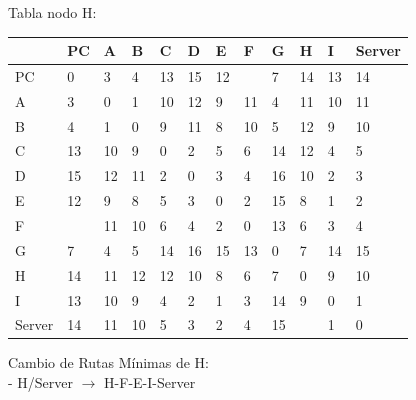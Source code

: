 \documentclass[a4paper]{article}
\begin{document}
\begin{table}[h]
Tabla nodo H:\\
\begin{tabular}{|l|l|l|l|l|l|l|l|l|l|l|l|}
\hline
       & PC & A  & B  & C  & D  & E  & F  & G  & H  & I  & Server \\ \hline
PC     & 0  & 3  & 4  & 13 & 15 & 12 &    & 7  & 14 & 13 & 14     \\ \hline
A      & 3  & 0  & 1  & 10 & 12 & 9  & 11 & 4  & 11 & 10 & 11     \\ \hline
B      & 4  & 1  & 0  & 9  & 11 & 8  & 10 & 5  & 12 & 9  & 10     \\ \hline
C      & 13 & 10 & 9  & 0  & 2  & 5  & 6  & 14 & 12 & 4  & 5      \\ \hline
D      & 15 & 12 & 11 & 2  & 0  & 3  & 4  & 16 & 10 & 2  & 3      \\ \hline
E      & 12 & 9  & 8  & 5  & 3  & 0  & 2  & 15 & 8  & 1  & 2      \\ \hline
F      &    & 11 & 10 & 6  & 4  & 2  & 0  & 13 & 6  & 3  & 4      \\ \hline
G      & 7  & 4  & 5  & 14 & 16 & 15 & 13 & 0  & 7  & 14 & 15     \\ \hline
H      & 14 & 11 & 12 & 12 & 10 & 8  & 6  & 7  & 0  & 9  & 10     \\ \hline
I      & 13 & 10 & 9  & 4  & 2  & 1  & 3  & 14 & 9  & 0  & 1      \\ \hline
Server & 14 & 11 & 10 & 5  & 3  & 2  & 4  & 15 &    & 1  & 0      \\ \hline
\end{tabular}

Cambio de Rutas Mínimas de H:\\
-	H/Server  $\rightarrow$  H-F-E-I-Server\\

\end{table}
\clearpage
\end{document}

